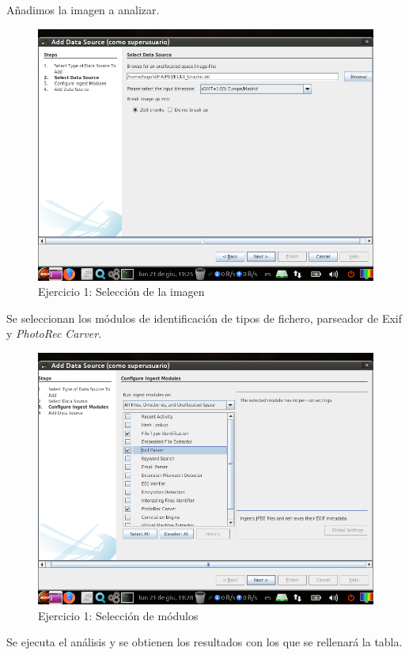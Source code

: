 \documentclass[11pt]{article}
\begin{document}
Añadimos la imagen a analizar.

\begin{figure}[H]
  \caption{Ejercicio 1: Selección de la imagen}
  \centering
  \includegraphics[scale=0.7]{e1-3.png}
\end{figure}

Se seleccionan los módulos de identificación de tipos de fichero, parseador de Exif y \textit{PhotoRec Carver}.

\begin{figure}[H]
  \caption{Ejercicio 1: Selección de módulos}
  \centering
  \includegraphics[scale=0.7]{e1-4.png}
\end{figure}

Se ejecuta el análisis y se obtienen los resultados con los que se rellenará la tabla.
\end{document}
